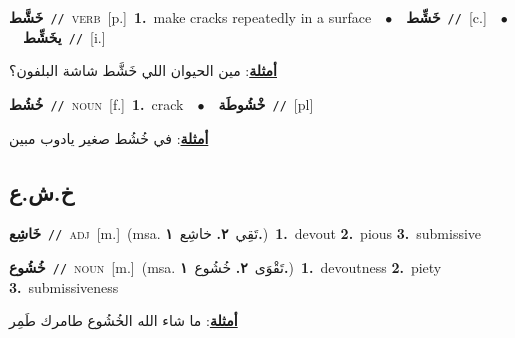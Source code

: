 \documentclass[10pt,a4paper,twoside]{article} %
\begin{document}
\begin{multicols}{2}
{\setlength\topsep{0pt}\textbf{\foreignlanguage{arabic}{خَشَّط}}\ {\color{gray}\texttt{//}\color{black}}\ \textsc{verb}\ [p.]\ \textbf{1.}~make cracks repeatedly in a surface\ \ $\bullet$\ \ \setlength\topsep{0pt}\textbf{\foreignlanguage{arabic}{خَشِّط}}\ {\color{gray}\texttt{//}\color{black}}\ [c.]\ \ $\bullet$\ \ \setlength\topsep{0pt}\textbf{\foreignlanguage{arabic}{يخَشِّط}}\ {\color{gray}\texttt{//}\color{black}}\ [i.]\  \begin{flushright}\color{gray}\foreignlanguage{arabic}{\textbf{\underline{\foreignlanguage{arabic}{أمثلة}}}: مين الحيوان اللي خَشَّط شاشة البلفون؟}\end{flushright}\color{black}} \vspace{2mm}

{\setlength\topsep{0pt}\textbf{\foreignlanguage{arabic}{خُشُط}}\ {\color{gray}\texttt{//}\color{black}}\ \textsc{noun}\ [f.]\ \textbf{1.}~crack\ \ $\bullet$\ \ \setlength\topsep{0pt}\textbf{\foreignlanguage{arabic}{خْشُوطَة}}\ {\color{gray}\texttt{//}\color{black}}\ [pl]\  \begin{flushright}\color{gray}\foreignlanguage{arabic}{\textbf{\underline{\foreignlanguage{arabic}{أمثلة}}}: في خُشُط صغير يادوب مبين}\end{flushright}\color{black}} \vspace{2mm}

\vspace{-3mm}
\subsection*{\color{blue}\foreignlanguage{arabic}{خ.ش.ع}\color{blue}{}} 

{\setlength\topsep{0pt}\textbf{\foreignlanguage{arabic}{خَاشِع}}\ {\color{gray}\texttt{//}\color{black}}\ \textsc{adj}\ [m.]\ \color{gray}(msa. \foreignlanguage{arabic}{تَقِي}~\foreignlanguage{arabic}{\textbf{٢.}}  \foreignlanguage{arabic}{خاشِع}~\foreignlanguage{arabic}{\textbf{١.}})\color{black}\ \textbf{1.}~devout  \textbf{2.}~pious  \textbf{3.}~submissive\ } \vspace{2mm}

{\setlength\topsep{0pt}\textbf{\foreignlanguage{arabic}{خُشُوع}}\ {\color{gray}\texttt{//}\color{black}}\ \textsc{noun}\ [m.]\ \color{gray}(msa. \foreignlanguage{arabic}{تَقْوَى}~\foreignlanguage{arabic}{\textbf{٢.}}  \foreignlanguage{arabic}{خُشُوع}~\foreignlanguage{arabic}{\textbf{١.}})\color{black}\ \textbf{1.}~devoutness  \textbf{2.}~piety  \textbf{3.}~submissiveness\  \begin{flushright}\color{gray}\foreignlanguage{arabic}{\textbf{\underline{\foreignlanguage{arabic}{أمثلة}}}: ما شاء الله الخُشُوع طامرك طَمِر}\end{flushright}\color{black}} \vspace{2mm}


\end{multicols}
\end{document}
